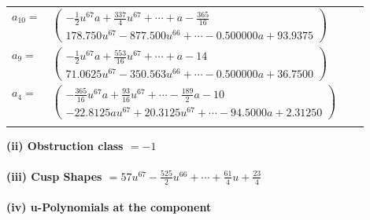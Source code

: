 \documentclass[1p]{elsarticle_modified}
\theoremstyle{definition}
\begin{document}
\begin{tabular}{m{7pt} m{180pt} m{7pt} m{180pt} }
\flushright $a_{10}=$&$\begin{pmatrix}-\frac{1}{2} u^{67} a+\frac{337}{4} u^{67}+\cdots+a-\frac{365}{16}\\178.750 u^{67}-877.500 u^{66}+\cdots-0.500000 a+93.9375\end{pmatrix}$ \\
\flushright $a_{9}=$&$\begin{pmatrix}-\frac{1}{2} u^{67} a+\frac{553}{16} u^{67}+\cdots+a-14\\71.0625 u^{67}-350.563 u^{66}+\cdots-0.500000 a+36.7500\end{pmatrix}$ \\
\flushright $a_{4}=$&$\begin{pmatrix}-\frac{365}{16} u^{67} a+\frac{93}{16} u^{67}+\cdots-\frac{189}{2} a-10\\-22.8125 a u^{67}+20.3125 u^{67}+\cdots-94.5000 a+2.31250\end{pmatrix}$\\&\end{tabular}
\flushleft \textbf{(ii) Obstruction class $= -1$}\\~\\
\flushleft \textbf{(iii) Cusp Shapes $= 57 u^{67}-\frac{525}{2} u^{66}+\cdots+\frac{61}{4} u+\frac{23}{4}$}\\~\\
\newpage\renewcommand{\arraystretch}{1}
\flushleft \textbf{(iv) u-Polynomials at the component}\newline \\
\end{document}
